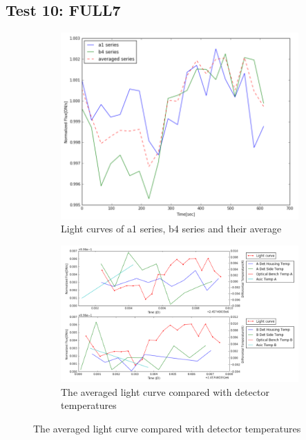 \documentclass{aastex6}
\begin{document}
\subsection{Test 10: FULL7} 
\begin{figure}[H]
    \centering
    \begin{subfigure}{1}
        \includegraphics[scale=0.4]{ts_test10}
        \caption{Light curves of a1 series, b4 series and their average}
    \end{subfigure}

    \begin{subfigure}{2}
        \includegraphics[scale=0.4]{temp_test10}
        \caption{The averaged light curve compared with detector temperatures}
    \end{subfigure}
   

\end{figure}
\end{document}
